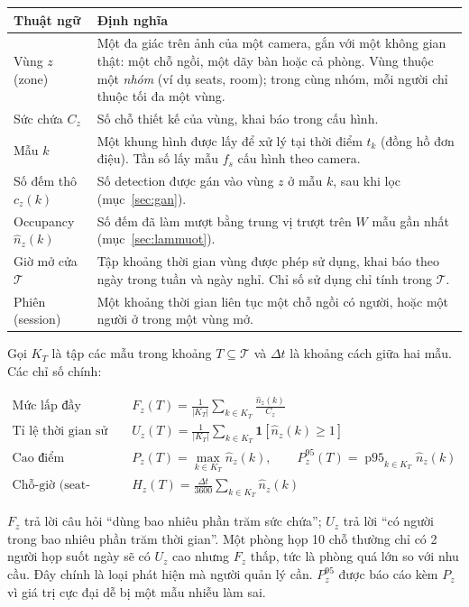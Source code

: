 \documentclass[10pt,a4paper,oneside,openany]{report}
\newcommand{\breakus}{\textunderscore\allowbreak}
\newcommand{\code}[1]{{\ttfamily\let\_\breakus #1}}
\newcommand{\tabhead}[1]{\textsf{\bfseries\color{ink}#1}}
\newenvironment{bang}{\par\small\rowcolors{2}{rowgray}{white}}{\par\vspace{0.3em}}
\begin{document}
\begin{bang}
\begin{tabularx}{\linewidth}{L{32mm}Y}
\toprule
\tabhead{Thuật ngữ} & \tabhead{Định nghĩa} \\
\midrule
Vùng $z$ (zone) & Một đa giác trên ảnh của một camera, gắn với một không gian thật: một chỗ ngồi, một dãy bàn hoặc cả phòng.
  Vùng thuộc một \emph{nhóm} (ví dụ \code{seats}, \code{room}); trong cùng nhóm, mỗi người chỉ thuộc tối đa một vùng. \\
Sức chứa $C_z$ & Số chỗ thiết kế của vùng, khai báo trong cấu hình. \\
Mẫu $k$ & Một khung hình được lấy để xử lý tại thời điểm $t_k$ (đồng hồ đơn điệu). Tần số lấy mẫu $f_s$ cấu hình theo camera. \\
Số đếm thô $c_z(k)$ & Số detection được gán vào vùng $z$ ở mẫu $k$, sau khi lọc (mục~\ref{sec:gan}). \\
Occupancy $\hat n_z(k)$ & Số đếm đã làm mượt bằng trung vị trượt trên $W$ mẫu gần nhất (mục~\ref{sec:lammuot}). \\
Giờ mở cửa $\mathcal{T}$ & Tập khoảng thời gian vùng được phép sử dụng, khai báo theo ngày trong tuần và ngày nghỉ. Chỉ số sử dụng chỉ tính trong $\mathcal{T}$. \\
Phiên (session) & Một khoảng thời gian liên tục một chỗ ngồi có người, hoặc một người ở trong một vùng mở. \\
\bottomrule
\end{tabularx}
\end{bang}

Gọi $K_T$ là tập các mẫu trong khoảng $T \subseteq \mathcal{T}$ và $\Delta t$ là khoảng cách giữa hai mẫu. Các chỉ số chính:

\begin{align}
  \text{Mức lấp đầy}\quad & F_z(T) = \frac{1}{|K_T|}\sum_{k\in K_T}\frac{\hat n_z(k)}{C_z} \\[2pt]
  \text{Tỉ lệ thời gian sử dụng}\quad & U_z(T) = \frac{1}{|K_T|}\sum_{k\in K_T}\mathbf{1}\!\left[\hat n_z(k)\ge 1\right] \\[2pt]
  \text{Cao điểm}\quad & P_z(T) = \max_{k\in K_T}\hat n_z(k), \qquad P^{95}_z(T) = \operatorname{p95}_{k\in K_T}\hat n_z(k) \\[2pt]
  \text{Chỗ-giờ (seat-hours)}\quad & H_z(T) = \frac{\Delta t}{3600}\sum_{k\in K_T}\hat n_z(k)
\end{align}

$F_z$ trả lời câu hỏi \enquote{dùng bao nhiêu phần trăm sức chứa}; $U_z$ trả lời \enquote{có người trong bao nhiêu phần trăm thời gian}.
Một phòng họp 10 chỗ thường chỉ có 2 người họp suốt ngày sẽ có $U_z$ cao nhưng $F_z$ thấp, tức là phòng quá lớn so với nhu cầu.
Đây chính là loại phát hiện mà người quản lý cần. $P^{95}_z$ được báo cáo kèm $P_z$ vì giá trị cực đại dễ bị một mẫu nhiễu làm sai.
\end{document}
